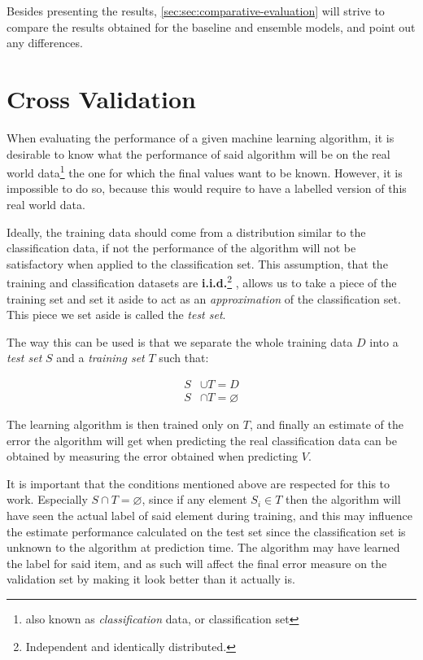 \documentclass[epsfig,a4paper,11pt,titlepage,twoside,openany]{book}
\begin{document}
Besides presenting the results, \autoref{sec:sec:comparative-evaluation} will strive to compare the results obtained for the baseline and ensemble models, and point out any differences.


\section{Cross Validation}
\label{sec:cross-validation}

When evaluating the performance of a given machine learning algorithm, it is desirable to know what the performance of said algorithm will be on the real world data\footnote{also known as \textit{classification} data, or classification set} the one for which the final values want to be known. However, it is impossible to do so, because this would require to have a labelled version of this real world data. 

Ideally, the training data should come from a distribution similar to the classification data, if not the performance of the algorithm will not be satisfactory when applied to the classification set. This assumption, that the training and classification datasets are \textbf{i.i.d.}\footnote{Independent and identically distributed.} \cite{clauset2011brief}, allows us to take a piece of the training set and set it aside to act as an \textit{approximation} of the classification set. This piece we set aside is called the \textit{test set}. 

The way this can be used is that we separate the whole training data $D$ into a \textit{test set} $S$ and a \textit{training set} $T$ such that:

\begin{align*}
    S &\cup T = D \\ 
    S &\cap T = \varnothing
\end{align*}

The learning algorithm is then trained only on $T$, and finally an estimate of the error the algorithm will get when predicting the real classification data can be obtained by measuring the error obtained when predicting $V$. 

It is important that the conditions mentioned above are respected for this to work. Especially $S \cap T = \varnothing$, since if any element $S_i \in T$ then the algorithm will have seen the actual label of said element during training, and this may influence the estimate performance calculated on the test set since the classification set is unknown to the algorithm at prediction time. The algorithm may have learned the label for said item, and as such will affect the final error measure on the validation set by making it look better than it actually is.
\end{document}
